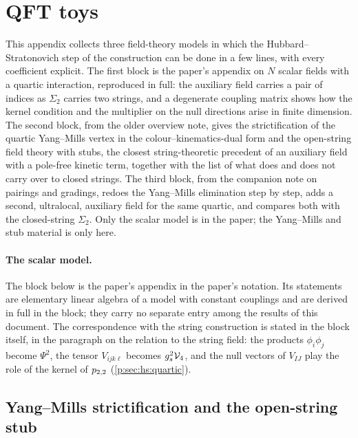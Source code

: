 \section{QFT toys}
\label{ch:qft-toys}

This appendix collects three field-theory models in which the Hubbard--Stratonovich step of the construction can be done in a few lines, with every coefficient explicit.
The first block is the paper's appendix on $N$ scalar fields with a quartic interaction, reproduced in full: the auxiliary field carries a pair of indices as $\Sigma_2$ carries two strings, and a degenerate coupling matrix shows how the kernel condition and the multiplier on the null directions arise in finite dimension.
The second block, from the older overview note, gives the strictification of the quartic Yang--Mills vertex in the colour--kinematics-dual form and the open-string field theory with stubs, the closest string-theoretic precedent of an auxiliary field with a pole-free kinetic term, together with the list of what does and does not carry over to closed strings.
The third block, from the companion note on pairings and gradings, redoes the Yang--Mills elimination step by step, adds a second, ultralocal, auxiliary field for the same quartic, and compares both with the closed-string $\Sigma_2$.
Only the scalar model is in the paper; the Yang--Mills and stub material is only here.

\paragraph{The scalar model.}
The block below is the paper's appendix in the paper's notation.
Its statements are elementary linear algebra of a model with constant couplings and are derived in full in the block; they carry no separate entry among the results of this document.
The correspondence with the string construction is stated in the block itself, in the paragraph on the relation to the string field: the products $\phi_i \phi_j$ become $\Psi^2$, the tensor $V_{ijk\ell}$ becomes $g_s^2 \mathcal{V}_{4}$, and the null vectors of $V_{IJ}$ play the role of the kernel of $p_{2,2}$ (\cref{p:sec:hs:quartic}).



\subsection{Yang--Mills strictification and the open-string stub}
\label{sec:qft:ov}

